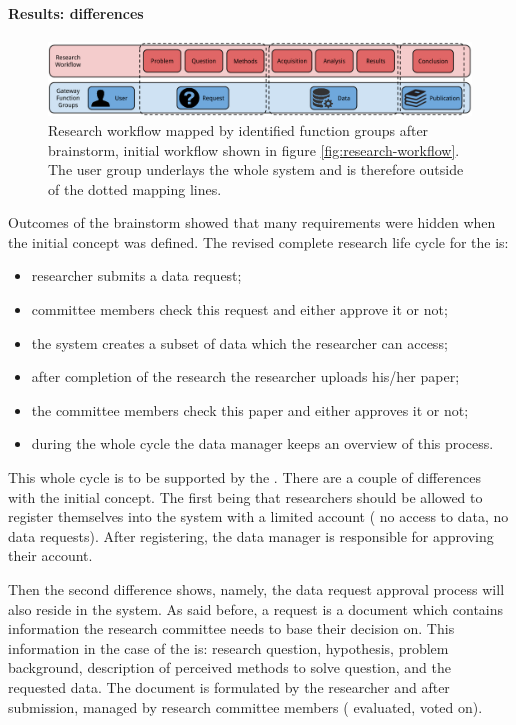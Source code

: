 \paragraph{Results: differences}

\begin{figure}[b]
	\centering
	\includegraphics[width=1.0\linewidth]{images/research-workflow-after}
	\caption{
		Research workflow mapped by identified function groups after brainstorm, initial workflow shown in figure \ref{fig:research-workflow}.
		The user group underlays the whole system and is therefore outside of the dotted mapping lines.
	}
	\label{fig:research-workflow-after}
\end{figure}

Outcomes of the brainstorm showed that many requirements were hidden when the initial concept was defined.
The revised complete research life cycle for the \project{} is:
\begin{itemize}
	\item researcher submits a data request;
	\item committee members check this request and either approve it or not;
	\item the system creates a subset of data which the researcher can access;
	\item after completion of the research the researcher uploads his/her paper;
	\item the committee members check this paper and either approves it or not;
	\item during the whole cycle the data manager keeps an overview of this process.
\end{itemize}

This whole cycle is to be supported by the \ivfsystem{}.
There are a couple of differences with the initial concept.
The first being that researchers should be allowed to register themselves into the system with a limited account (\ie{} no access to data, no data requests).
After registering, the data manager is responsible for approving their account.

Then the second difference shows, namely, the data request approval process will also reside in the system.
As said before, a request is a document which contains information the research committee needs to base their decision on.
This information in the case of the \ivfsystem{} is: research question, hypothesis, problem background, description of perceived methods to solve question, and the requested data.
The document is formulated by the researcher and after submission, managed by research committee members (\ie{} evaluated, voted on).

